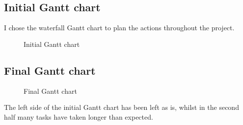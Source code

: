 \documentclass[../documentation.tex]{subfiles}
\begin{document}
\thispagestyle{empty} %

\subsection{Initial Gantt chart}

I chose the waterfall Gantt chart to plan the actions
throughout the project.

\begin{figure}[h]
    \centering
    \caption{Initial Gantt chart}
\end{figure}

\pagebreak

\thispagestyle{empty} %
            
\subsection{Final Gantt chart}

\begin{figure}[h]
    \centering
    \caption{Final Gantt chart}
\end{figure}

The left side of the initial Gantt chart
has been left as is, whilst in the second half
many tasks have taken longer than expected.
\end{document}
